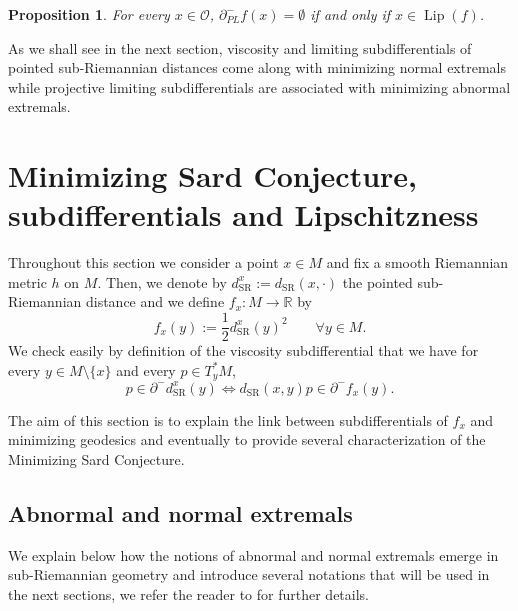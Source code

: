 \documentclass[JEP,XML,SOM,Unicode,NoFloatCountersInSection,published]{cedram}
\newcommand{\SR}{{\scriptscriptstyle\mathrm{SR}}}
\DeclareMathOperator{\Lip}{Lip}
\newcommand\R{\mathbb R}
\newtheorem{proposition}[theorem]{Proposition}
\theoremstyle{definition}
\begin{document}
\begin{proposition}\label{PROPLip-PL}
For every $x\in \mathcal{O}$, $\partial^-_{PL}f(x)=\emptyset$ if and only if $x\in \Lip(f)$.
\end{proposition}

As we shall see in the next section, viscosity and limiting subdifferentials of pointed sub-Riemannian distances come along with minimizing normal extremals while projective limiting subdifferentials are associated with minimizing abnormal extremals.

\section{Minimizing Sard Conjecture, subdifferentials and Lipschitzness}\label{SEC3}

Throughout this section we consider a point $x\in M$ and fix a smooth Riemannian metric $h$ on $M$. Then, we denote by $d_{\SR}^x:=d_{\SR}(x,\cdot)$ the pointed sub-Riemannian distance and we define $f_x:M\to \R$ by
\begin{equation}\label{19oct1}
f_x(y) := \frac{1}{2} d_{\SR}^x(y)^2 \qquad \forall y \in M.
\end{equation}
We check easily by definition of the viscosity subdifferential that we have for every $y\in M\setminus \{x\}$ and every $p\in T_y^*M$,
\begin{equation}
p \in \partial^-d_{\SR}^x(y) \iff d_{\SR}(x,y) p \in \partial^-f_x(y).
\end{equation}

The aim of this section is to explain the link between subdifferentials of $f_x$ and minimizing geodesics and eventually to provide several characterization of the Minimizing Sard Conjecture.

\subsection{Abnormal and normal extremals}\label{SECExtremals}

We explain below how the notions of abnormal and normal extremals emerge in sub-Riemannian geometry and introduce several notations that will be used in the next sections, we refer the reader to \cite{riffordbook} for further details.
\end{document}
